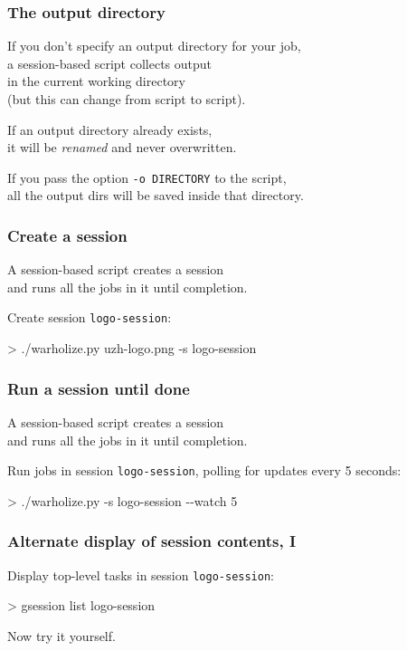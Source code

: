 \documentclass[english,serif,mathserif,usenames,dvipsnames]{beamer}
\begin{document}
\begin{frame}
  \frametitle{The output directory}
  \begin{center}
    If you don't specify an output directory for your job, \\ a
    session-based script collects output \\ in the current working
    directory \\ (but this can change from script to script).

    \+ If an output directory already exists, \\ it will be
    \textit{renamed} and never overwritten.

    \+ If you pass the option \lstinline|-o DIRECTORY| to the script, \\
    all the output dirs will be saved inside that directory.
  \end{center}
\end{frame}


\begin{frame}
  \frametitle{Create a session}

  A session-based script \alert{creates a session}
  \\
  and runs all the jobs in it until completion.

  \+ Create session \texttt{logo-session}:
\begin{semiverbatim}
    > ./warholize.py uzh-logo.png -s logo-session
\end{semiverbatim}
\end{frame}


\begin{frame}
  \frametitle{Run a session until done}

  A session-based script creates a session
  \\
  and \alert{runs all the jobs in it until completion.}

  \+ Run jobs in session \texttt{logo-session},
  polling for updates every 5 seconds:
\begin{semiverbatim}
    > ./warholize.py -s logo-session -{}-watch 5
\end{semiverbatim}

  \+ 
\end{frame}


\begin{frame}
  \frametitle{Alternate display of session contents, I}

  Display top-level tasks in session \texttt{logo-session}:
\begin{semiverbatim}
    > gsession list logo-session
\end{semiverbatim}

  \begin{exercise}
    Now try it yourself.
  \end{exercise}
\end{frame}
\end{document}
